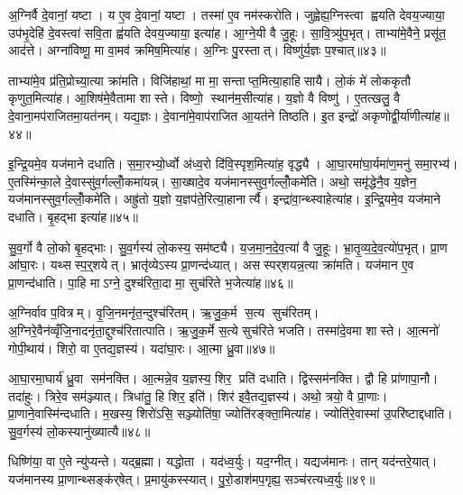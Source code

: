 अ॒ग्निर्वै दे॒वानां॒ यष्टा। य ए॒व दे॒वानां॒ यष्टा। तस्मा॑ ए॒व नम॑स्करोति। जुह्वेह्य॒ग्निस्त्वा ह्वयति देवय॒ज्याया॒ उप॑भृ॒देहि॑ दे॒वस्त्वा॑ सवि॒ता ह्व॑यति देवय॒ज्याया॒ इत्या॑ह। आ॒ग्ने॒यी वै जु॒हूः। सा॒वि॒त्र्यु॑प॒भृत्। ताभ्या॑मे॒वैने॒ प्रसू॑त॒ आद॑त्ते। अग्ना॑विष्णू॒ मा वा॒मव॑ क्रमिष॒मित्या॑ह। अ॒ग्निः पु॒रस्तात्। विष्णु॑र्य॒ज्ञः प॒श्चात्॥४३॥

ताभ्या॑मे॒व प्र॑ति॒प्रोच्या॒त्या क्रा॑मति। विजि॑हाथां॒ मा मा॒ सन्ताप्त॒मित्या॒हाहिसायै। लो॒कं मे॑ लोककृतौ कृणुत॒मित्या॑ह। आ॒शिष॑मे॒वैतामा शास्ते। विष्णो॒ स्थान॑म॒सीत्या॑ह। य॒ज्ञो वै विष्णु॑। ए॒तत्खलु॒ वै दे॒वाना॒मप॑राजितमा॒यत॑नम्। यद्य॒ज्ञः। दे॒वाना॑मे॒वाप॑राजित आ॒यत॑ने तिष्ठति। इ॒त इन्द्रो॑ अकृणोद्वी॒र्या॑णीत्या॑ह॥४४॥

इ॒न्द्रि॒यमे॒व यज॑माने दधाति। स॒मा॒रभ्यो॒र्ध्वो अ॑ध्व॒रो दि॑वि॒स्पृश॒मित्या॑ह॒ वृद्ध्यै। आ॒घा॒रमा॑घा॒र्यमा॑ण॒मनु॑ समा॒रभ्य॑। ए॒तस्मि॑न्का॒ले दे॒वास्सु॑व॒र्गल्लोँ॒कमा॑यन्न्। सा॒ख्षादे॒व यज॑मानस्सुव॒र्गल्लोँ॒कमे॑ति। अथो॒ समृ॑द्धेनै॒व य॒ज्ञेन॒ यज॑मानस्सुव॒र्गल्लोँ॒कमे॑ति। अह्रु॑तो य॒ज्ञो य॒ज्ञप॑ते॒रित्या॒हानार्त्यै। इन्द्रा॑वा॒न्थ्स्वाहेत्या॑ह। इ॒न्द्रि॒यमे॒व यज॑माने दधाति। बृ॒हद्भा इत्या॑ह॥४५॥

सु॒व॒र्गो वै लो॒को बृ॒हद्भाः। सु॒व॒र्गस्य॑ लो॒कस्य॒ सम॑ष्ट्यै। य॒ज॒मा॒न॒दे॒व॒त्या॑ वै जु॒हूः। भ्रा॒तृ॒व्य॒दे॒व॒त्यो॑प॒भृत्। प्रा॒ण आ॑घा॒रः। यथ्सस्प॒र्॒शयेत्। भ्रातृ॑व्येऽस्य प्रा॒णन्द॑ध्यात्। असस्पर्‌शयन्न॒त्या क्रा॑मति। यज॑मान ए॒व प्रा॒णन्द॑धाति। पा॒हि माऽग्ने॒ दुश्च॑रिता॒दा मा॒ सुच॑रिते भ॒जेत्या॑ह॥४६॥

अ॒ग्निर्वाव प॒वित्रम्। वृ॒जि॒नमनृ॑त॒न्दुश्च॑रितम्। ऋ॒जु॒क॒र्म स॒त्य सुच॑रितम्। अ॒ग्निरे॒वैन॑व्वृँजि॒नादनृ॑ता॒द्दुश्च॑रितात्पाति। ऋ॒जु॒क॒र्मे स॒त्ये सुच॑रिते भजति। तस्मा॑दे॒वमा शास्ते। आ॒त्मनो॑ गोपी॒थाय॑। शिरो॒ वा ए॒तद्य॒ज्ञस्य॑। यदा॑घा॒रः। आ॒त्मा ध्रु॒वा॥४७॥

आ॒घा॒रमा॒घार्य॑ ध्रु॒वा सम॑नक्ति। आ॒त्मन्ने॒व य॒ज्ञस्य॒ शिर॒ प्रति॑ दधाति। द्विस्सम॑नक्ति। द्वौ हि प्रा॑णापा॒नौ। तदा॑हुः। त्रिरे॒व सम॑ञ्ज्यात्। त्रिधा॑तु॒ हि शिर॒ इति॑। शिर॑ इवै॒तद्य॒ज्ञस्य॑। अथो॒ त्रयो॒ वै प्रा॒णाः। प्रा॒णाने॒वास्मि॑न्दधाति। म॒खस्य॒ शिरो॑ऽसि॒ सञ्ज्योति॑षा॒ ज्योति॑रङ्क्ता॒मित्या॑ह। ज्योति॑रे॒वास्मा॑ उ॒परि॑ष्टाद्दधाति। सु॒व॒र्गस्य॑ लो॒कस्यानु॑ख्यात्यै॥४८॥\anuvakamend[परि॑दधाति प्रा॒णन्द॑धाति॒ हि य॒ज्ञो घा॑रयति॒ नम॒ इत्या॑ह प॒श्चाद्वी॒र्या॑णीत्या॑ह॒ भा इत्या॑ह भ॒जेत्या॑ह ध्रु॒वैवास्मि॑न्दधाति॒ त्रीणि॑ च]

धिष्णि॑या॒ वा ए॒ते न्यु॑प्यन्ते। यद्ब्र॒ह्मा। यद्धोता। यद॑ध्व॒र्युः। यद॒ग्नीत्। यद्यज॑मानः। तान् यद॑न्तरे॒यात्। यज॑मानस्य प्रा॒णान्थ्सङ्क॑र्‌षेत्। प्र॒मायु॑कस्स्यात्। पु॒रो॒डाश॑मप॒गृह्य॒ सञ्च॑रत्यध्व॒र्युः॥४९॥

